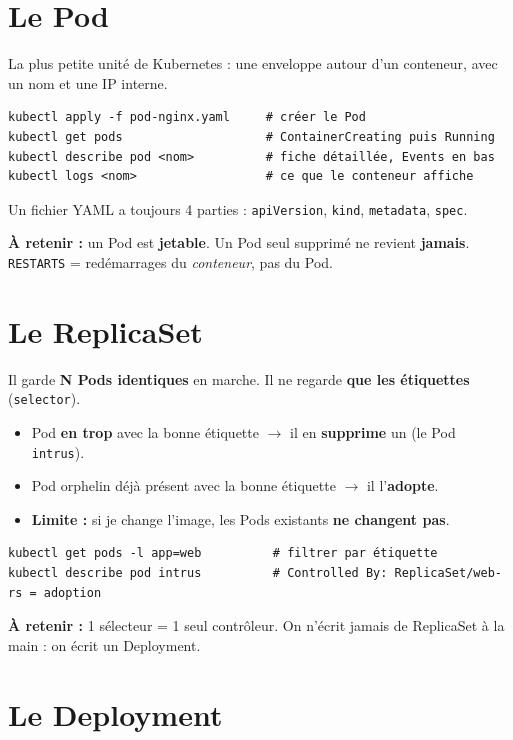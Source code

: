\documentclass[11pt,a4paper]{article}
\newcommand{\retenir}[1]{\par\smallskip\noindent\colorbox{fond}{\parbox{\dimexpr\linewidth-2\fboxsep}{\textbf{\textcolor{bleu}{À retenir :}} #1}}\par\smallskip}
\begin{document}
\section{Le Pod}

La plus petite unité de Kubernetes : une enveloppe autour d'un conteneur, avec un nom et une IP interne.

\begin{lstlisting}
kubectl apply -f pod-nginx.yaml     # créer le Pod
kubectl get pods                    # ContainerCreating puis Running
kubectl describe pod <nom>          # fiche détaillée, Events en bas
kubectl logs <nom>                  # ce que le conteneur affiche
\end{lstlisting}

Un fichier YAML a toujours 4 parties : \texttt{apiVersion}, \texttt{kind}, \texttt{metadata}, \texttt{spec}.

\retenir{un Pod est \textbf{jetable}. Un Pod seul supprimé ne revient \textbf{jamais}.\\
\texttt{RESTARTS} = redémarrages du \emph{conteneur}, pas du Pod.}

\section{Le ReplicaSet}

Il garde \textbf{N Pods identiques} en marche. Il ne regarde \textbf{que les étiquettes} (\texttt{selector}).

\begin{itemize}
  \item Pod \textbf{en trop} avec la bonne étiquette $\rightarrow$ il en \textbf{supprime} un (le Pod \texttt{intrus}).
  \item Pod orphelin déjà présent avec la bonne étiquette $\rightarrow$ il l'\textbf{adopte}.
  \item \textbf{Limite :} si je change l'image, les Pods existants \textbf{ne changent pas}.
\end{itemize}

\begin{lstlisting}
kubectl get pods -l app=web          # filtrer par étiquette
kubectl describe pod intrus          # Controlled By: ReplicaSet/web-rs = adoption
\end{lstlisting}
\retenir{1 sélecteur = 1 seul contrôleur. On n'écrit jamais de ReplicaSet à la main : on écrit un Deployment.}

\section{Le Deployment}
\end{document}
